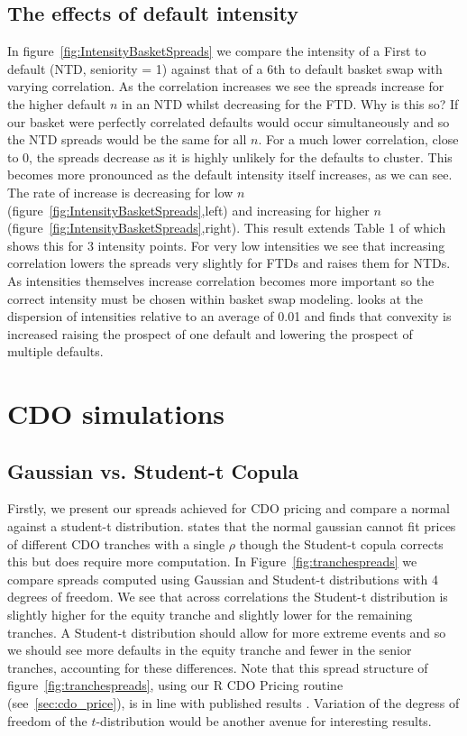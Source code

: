 \subsection{The effects of default intensity}

In figure~\ref{fig:IntensityBasketSpreads} we compare the intensity of a First to default (NTD, seniority = 1) against that of a 6th to default basket swap with varying correlation.  As the correlation increases we see the spreads increase for the higher default $n$ in an NTD whilst decreasing for the FTD.  Why is this so?  If our basket were perfectly correlated defaults would occur simultaneously and so the NTD spreads would be the same for all $n$.  For a much lower correlation, close to 0, the spreads decrease as it is highly unlikely for the defaults to cluster.  This becomes more pronounced as the default intensity itself increases, as we can see. The rate of increase is decreasing for low $n$ (figure~\ref{fig:IntensityBasketSpreads},left) and increasing for higher $n$ (figure~\ref{fig:IntensityBasketSpreads},right). This result extends Table 1 of \cite{hw2004} which shows this for 3 intensity points.  For very low intensities we see that increasing correlation lowers the spreads very slightly for FTDs and raises them for NTDs.  As intensities themselves increase correlation becomes more important so the correct intensity must be chosen within basket swap modeling. \cite{hw2004} looks at the dispersion of intensities relative to an average of 0.01 and finds that convexity is increased raising the prospect of one default and lowering the prospect of multiple defaults.


\section{CDO simulations}\label{sec:cdo_exp}

\subsection{Gaussian vs. Student-t Copula}

Firstly, we present our spreads achieved for CDO pricing and compare a normal against a student-t distribution. \cite{Eli2006} states that the normal gaussian cannot fit prices of different CDO tranches with a single $\rho$ though the Student-t copula corrects this but does require more computation. In Figure~\ref{fig:tranchespreads} we compare spreads computed using Gaussian and Student-t distributions with 4 degrees of freedom. We see that across correlations the Student-t distribution is slightly higher for the equity tranche and slightly lower for the remaining tranches. A Student-t distribution should allow for more extreme events and so we should see more defaults in the equity tranche and fewer in the senior tranches, accounting for these differences.  Note that this spread structure of figure~\ref{fig:tranchespreads}, using our R CDO Pricing routine (see~\ref{sec:cdo_price}), is in line with published results \cite{hw2004,bv2005}. Variation of the degress of freedom of the $t$-distribution would be another avenue for interesting results.


